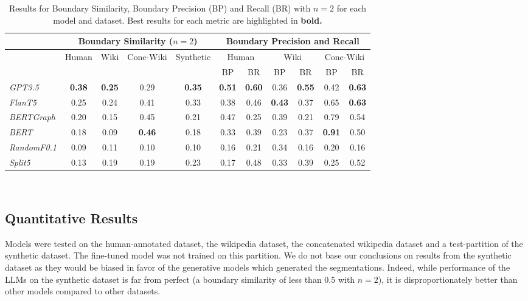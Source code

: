 
\begin{table*}[ht]
    \centering
    \begin{tabular}{@{}lcccc@{\hspace{2em}}ccccc@{\hspace{0.2em}}c@{}}
    \toprule
    & \multicolumn{4}{c}{Boundary Similarity ($n=2$)} & \multicolumn{6}{c}{Boundary Precision and Recall} \\ 
    \midrule
    & Human & Wiki & Conc-Wiki & Synthetic & \multicolumn{2}{c}{Human} & \multicolumn{2}{c}{Wiki} & \multicolumn{2}{c}{Conc-Wiki} \\ 
    &  &  &  &  & BP & BR & BP & BR & BP & BR \\
    \midrule
    \it GPT3.5  & \bf 0.38 & \bf 0.25 & 0.29 & \bf 0.35 & \bf 0.51 & \bf 0.60 & 0.36 & \bf 0.55 & 0.42 & \bf 0.63 \\ 
    \it FlanT5  & 0.25 & 0.24 & 0.41 & 0.33 & 0.38 & 0.46 & \bf 0.43 & 0.37 & 0.65 & \bf 0.63 \\ 
    \midrule
    \it BERTGraph   & 0.20 & 0.15 & 0.45 & 0.21 & 0.47 & 0.25 & 0.39 & 0.21 & 0.79 & 0.54 \\ 
    \it BERT    & 0.18 & 0.09 & \bf 0.46 & 0.18 & 0.33 & 0.39 & 0.23 & 0.37 & \bf 0.91 & 0.50 \\ 
    \it RandomF0.1 & 0.09 & 0.11 & 0.10 & 0.10 & 0.16 & 0.21 & 0.34 & 0.16 & 0.20 & 0.16 \\ 
    \it Split5  & 0.13 & 0.19 & 0.19 & 0.23 & 0.17 & 0.48 & 0.33 & 0.39 & 0.25 & 0.52 \\ 
    \bottomrule
    \end{tabular}
    \caption{Results for Boundary Similarity, Boundary Precision (BP) and Recall (BR) with $n=2$ for each model and dataset. Best results for each metric are highlighted in \bf bold.}~\label{tab:combined_results}
\end{table*}


\subsection{Quantitative Results}

Models were tested on the human-annotated dataset, the wikipedia dataset, the concatenated wikipedia dataset and a test-partition of the synthetic dataset. The fine-tuned model was not trained on this partition. We do not base our conclusions on results from the synthetic dataset as they would be biased in favor of the generative models which generated the segmentations. Indeed, while performance of the LLMs on the synthetic dataset is far from perfect (a boundary similarity of less than 0.5 with $n=2$), it is disproportionately better than other models compared to other datasets.

